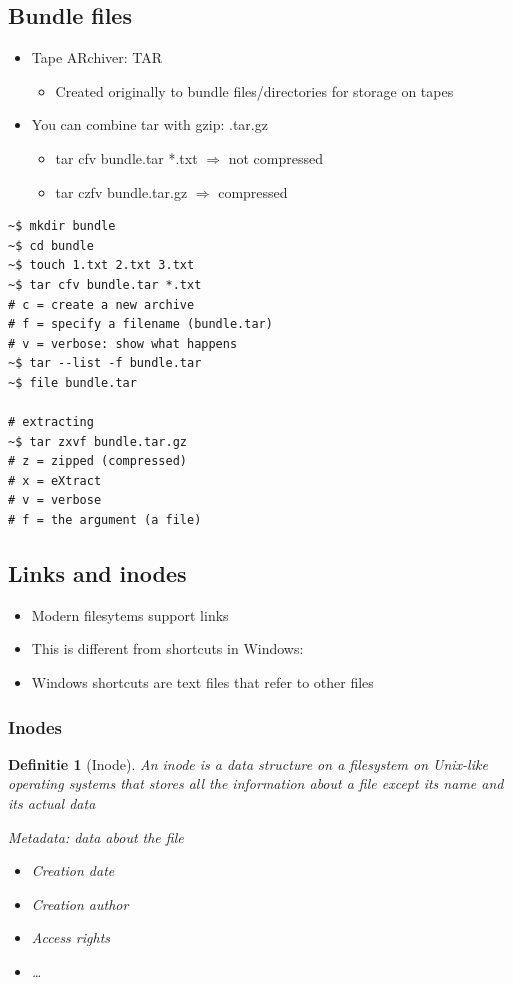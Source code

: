\documentclass{article}
\newtheorem{theorem}{Definitie}[section]
\begin{document}
\subsection{Bundle files}

\begin{itemize}
    \item Tape ARchiver: TAR
    \begin{itemize}
        \item Created originally to bundle files/directories for storage on tapes
    \end{itemize}
    \item You can combine tar with gzip: .tar.gz
    \begin{itemize}
        \item tar cfv bundle.tar *.txt $\Rightarrow$ not compressed
        \item tar czfv bundle.tar.gz $\Rightarrow$ compressed
    \end{itemize}
\end{itemize}

\begin{verbatim}
~$ mkdir bundle
~$ cd bundle
~$ touch 1.txt 2.txt 3.txt
~$ tar cfv bundle.tar *.txt
# c = create a new archive
# f = specify a filename (bundle.tar)
# v = verbose: show what happens
~$ tar --list -f bundle.tar
~$ file bundle.tar

# extracting
~$ tar zxvf bundle.tar.gz
# z = zipped (compressed)
# x = eXtract
# v = verbose
# f = the argument (a file) 
\end{verbatim}

\subsection{Links and inodes}

\begin{itemize}
    \item Modern filesytems support links
    \item This is different from shortcuts in Windows:
    \item Windows shortcuts are text files that refer to other files
\end{itemize}

\subsubsection{Inodes}

\begin{theorem}[Inode]
    An inode is a data structure on a filesystem on Unix-like operating systems that 
    stores all the information about a file except its name and its actual data

    Metadata: data about the file
    \begin{itemize}
        \item Creation date
        \item Creation author
        \item Access rights
        \item \dots
    \end{itemize}
\end{theorem}
\end{document}
